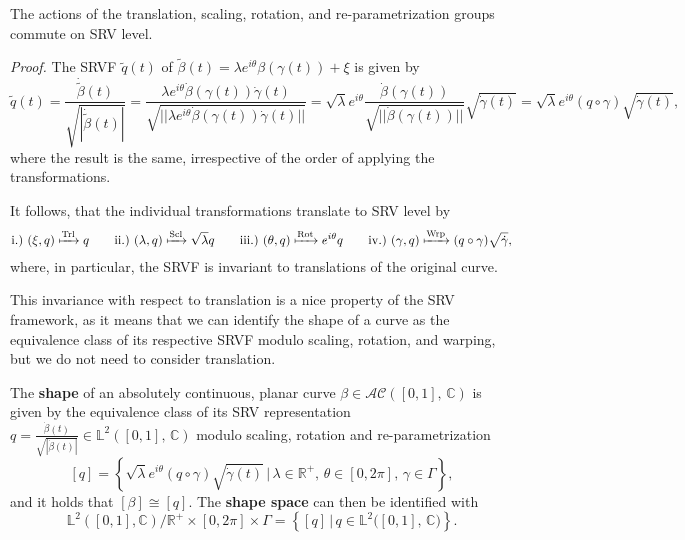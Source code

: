 \begin{lemma}
  The actions of the translation, scaling, rotation, and re-parametrization groups commute on SRV level.
\end{lemma}

\noindent\textit{Proof.} The SRVF $\tilde q(t)$ of  $\tilde\beta(t) = \lambda e^{i\theta}\beta\left(\gamma(t)\right) + \xi$ is given by
$$ \tilde q (t) 
  = \frac{\dot{\tilde\beta}(t)}{\sqrt{| \dot{\tilde\beta}(t) |}} 
  = \frac{\lambda e^{i\theta} \dot\beta\left(\gamma(t)\right) \dot\gamma(t)}{\sqrt{||\lambda e^{i\theta} \dot\beta\left(\gamma(t)\right) \dot\gamma(t)||}} 
  = \sqrt{\lambda} e^{i\theta} \frac{\dot\beta\left(\gamma(t)\right)}{\sqrt{||\dot\beta\left(\gamma(t)\right)||}} \sqrt{\dot\gamma(t)} 
  = \sqrt\lambda e^{i\theta} \left( q \circ \gamma \right) \sqrt{\dot\gamma(t)},$$
where the result is the same, irrespective of the order of applying the transformations.

\begin{remark}
  It follows, that the individual transformations translate to SRV level by
    $$\text{i.)} \,\, (\xi, q) \xmapsto{\text{Trl}} q \qquad \text{ii.)} \,\, (\lambda, q) \xmapsto{\text{Scl}} \sqrt\lambda q \qquad \text{iii.)} \,\, (\theta, q) \xmapsto{\text{Rot}} e^{i\theta} q \qquad \text{iv.)} \,\, (\gamma, q) \xmapsto{\text{Wrp}} (q \circ \gamma) \sqrt{\dot\gamma}, $$
  where, in particular, the SRVF is invariant to translations of the original curve.
\end{remark}

\noindent This invariance with respect to translation is a nice property of the SRV framework, as it means that we can identify the shape of a curve as the equivalence class of its respective SRVF modulo scaling, rotation, and warping, but we do not need to consider translation.
\begin{definition}
  The \textbf{shape} of an absolutely continuous, planar curve $\beta \in \mathcal{AC}([0,1],\, \mathbb{C})$ is given by the equivalence class of its SRV representation $q = \frac{\dot\beta(t)}{\sqrt{|\dot\beta(t)|}} \in \mathbb{L}^2([0,1],\,\mathbb{C})$ modulo scaling, rotation and re-parametrization
  $$[q] = \left\{\sqrt\lambda e^{i\theta}(q \circ \gamma) \sqrt{\dot\gamma(t)} \,|\, \lambda \in \mathbb{R}^+,\, \theta \in [0,2\pi],\, \gamma
  \in \Gamma\right\},$$
  and it holds that $[\beta] \cong [q]$. The \textbf{shape space} can then be identified with 
  $$\mathbb{L}^2([0,1], \mathbb{C}) \big/ \mathbb{R}^+ \times [0,2\pi] \times \Gamma = \left\{[q]\,|\,q \in \mathbb{L}^2({[0,1],\,\mathbb{C})}\right\}.$$
\end{definition}

